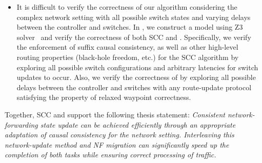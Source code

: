 \begin{itemize}
\item It is difficult to verify the correctness of our algorithm considering the complex network setting with all possible switch states and varying delays between the controller and switches. In , we construct a model using Z3 solver~\cite{Z3Solver} and verify the correctness of both SCC and \sysname. Specifically, we verify the enforcement of suffix causal consistency, as well as other high-level routing properties (black-hole freedom, etc.) for the SCC algorithm by exploring all possible switch configurations and arbitrary latencies for switch updates to occur. Also, we verify the correctness of \sysname by exploring all possible delays between the controller and switches with any route-update protocol satisfying the property of relaxed waypoint correctness. 

\end{itemize}


Together, SCC and \sysname support the following thesis statement: \textit{Consistent network-forwarding state update can be achieved efficiently through an appropriate adaptation of causal consistency for the network setting. Interleaving this network-update method and NF migration can significantly speed up the completion of both tasks while ensuring correct processing of traffic.} 




